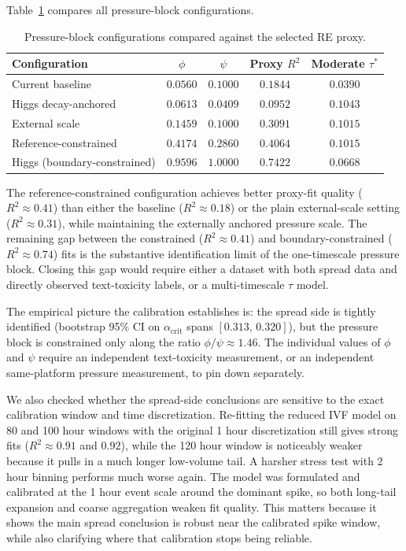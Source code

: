 \documentclass[11pt]{article}
\begin{document}
Table~\ref{tab:tauconfigs} compares all pressure-block configurations.

\begin{table}[htbp]
\centering
\caption{Pressure-block configurations compared against the selected RE proxy.}
\label{tab:tauconfigs}
\begin{tabular}{lcccc}
\toprule
Configuration & $\phi$ & $\psi$ & Proxy $R^2$ & Moderate $\tau^*$ \\
\midrule
Current baseline & $0.0560$ & $0.1000$ & $0.1844$ & $0.0390$ \\
Higgs decay-anchored & $0.0613$ & $0.0409$ & $0.0952$ & $0.1043$ \\
External scale & $0.1459$ & $0.1000$ & $0.3091$ & $0.1015$ \\
Reference-constrained & $0.4174$ & $0.2860$ & $0.4064$ & $0.1015$ \\
Higgs (boundary-constrained)\footnotemark & $0.9596$ & $1.0000$ & $0.7422$ & $0.0668$ \\
\bottomrule
\end{tabular}
\end{table}

The reference-constrained configuration achieves better proxy-fit quality ($R^2 \approx 0.41$) than either the baseline ($R^2 \approx 0.18$) or the plain external-scale setting ($R^2 \approx 0.31$), while maintaining the externally anchored pressure scale. The remaining gap between the constrained ($R^2 \approx 0.41$) and boundary-constrained ($R^2 \approx 0.74$) fits is the substantive identification limit of the one-timescale pressure block. Closing this gap would require either a dataset with both spread data and directly observed text-toxicity labels, or a multi-timescale $\tau$ model.

The empirical picture the calibration establishes is: the spread side is tightly identified (bootstrap 95\% CI on $\alpha_{\mathrm{crit}}$ spans $[0.313,\,0.320]$), but the pressure block is constrained only along the ratio $\phi/\psi \approx 1.46$. The individual values of $\phi$ and $\psi$ require an independent text-toxicity measurement, or an independent same-platform pressure measurement, to pin down separately.

We also checked whether the spread-side conclusions are sensitive to the exact calibration window and time discretization. Re-fitting the reduced IVF model on 80 and 100 hour windows with the original 1 hour discretization still gives strong fits ($R^2 \approx 0.91$ and $0.92$), while the 120 hour window is noticeably weaker because it pulls in a much longer low-volume tail. A harsher stress test with 2 hour binning performs much worse again. The model was formulated and calibrated at the 1 hour event scale around the dominant spike, so both long-tail expansion and coarse aggregation weaken fit quality. This matters because it shows the main spread conclusion is robust near the calibrated spike window, while also clarifying where that calibration stops being reliable.
\end{document}
